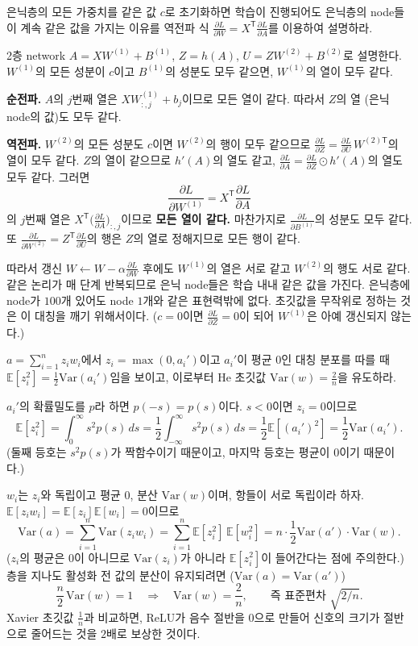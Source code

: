 \documentclass[11pt,a4paper]{article}
\newcommand{\T}{^{\mathsf T}}
\newcommand{\pd}[2]{\frac{\partial #1}{\partial #2}}
\begin{document}
\begin{problems}
\item 은닉층의 모든 가중치를 같은 값 $c$로 초기화하면 학습이 진행되어도 은닉층의 node들이
계속 같은 값을 가지는 이유를 역전파 식 $\pd{L}{W}=X\T\pd{L}{A}$를 이용하여 설명하라.

\begin{sol}
2층 network $A=XW^{(1)}+B^{(1)}$, $Z=h(A)$, $U=ZW^{(2)}+B^{(2)}$로 설명한다.
$W^{(1)}$의 모든 성분이 $c$이고 $B^{(1)}$의 성분도 모두 같으면, $W^{(1)}$의 열이 모두 같다.

\textbf{순전파.} $A$의 $j$번째 열은 $XW^{(1)}_{:,j}+b_j$이므로 모든 열이 같다. 따라서 $Z$의 열 (은닉 node의 값)도 모두 같다.

\textbf{역전파.} $W^{(2)}$의 모든 성분도 $c$이면 $W^{(2)}$의 행이 모두 같으므로 $\pd{L}{Z}=\pd{L}{U}\,W^{(2)\mathsf T}$의 열이 모두 같다.
$Z$의 열이 같으므로 $h'(A)$의 열도 같고, $\pd{L}{A}=\pd{L}{Z}\odot h'(A)$의 열도 모두 같다.
그러면
\[
\pd{L}{W^{(1)}}=X\T\pd{L}{A}
\]
의 $j$번째 열은 $X\T\bigl(\pd{L}{A}\bigr)_{:,j}$이므로 \textbf{모든 열이 같다.} 마찬가지로 $\pd{L}{B^{(1)}}$의 성분도 모두 같다.
또 $\pd{L}{W^{(2)}}=Z\T\pd{L}{U}$의 행은 $Z$의 열로 정해지므로 모든 행이 같다.

따라서 갱신 $W\leftarrow W-\alpha\pd{L}{W}$ 후에도 $W^{(1)}$의 열은 서로 같고 $W^{(2)}$의 행도 서로 같다.
같은 논리가 매 단계 반복되므로 은닉 node들은 학습 내내 같은 값을 가진다.
은닉층에 node가 $100$개 있어도 node $1$개와 같은 표현력밖에 없다.
초깃값을 무작위로 정하는 것은 이 대칭을 깨기 위해서이다.
($c=0$이면 $\pd{L}{Z}=0$이 되어 $W^{(1)}$은 아예 갱신되지 않는다.)
\end{sol}

\item $a=\sum_{i=1}^{n}z_iw_i$에서 $z_i=\max(0,a_i')$이고 $a_i'$이 평균 $0$인 대칭 분포를 따를 때
$\mathbb E[z_i^2]=\frac12\mathrm{Var}(a_i')$임을 보이고, 이로부터 He 초깃값 $\mathrm{Var}(w)=\frac2n$을 유도하라.

\begin{sol}
$a_i'$의 확률밀도를 $p$라 하면 $p(-s)=p(s)$이다. $s<0$이면 $z_i=0$이므로
\[
\mathbb E[z_i^2]=\int_0^{\infty}s^2p(s)\,ds
=\frac12\int_{-\infty}^{\infty}s^2p(s)\,ds
=\frac12\mathbb E[(a_i')^2]=\frac12\mathrm{Var}(a_i') .
\]
(둘째 등호는 $s^2p(s)$가 짝함수이기 때문이고, 마지막 등호는 평균이 $0$이기 때문이다.)

$w_i$는 $z_i$와 독립이고 평균 $0$, 분산 $\mathrm{Var}(w)$이며, 항들이 서로 독립이라 하자.
$\mathbb E[z_iw_i]=\mathbb E[z_i]\mathbb E[w_i]=0$이므로
\[
\mathrm{Var}(a)=\sum_{i=1}^{n}\mathrm{Var}(z_iw_i)=\sum_{i=1}^{n}\mathbb E[z_i^2]\,\mathbb E[w_i^2]
=n\cdot\frac12\mathrm{Var}(a')\cdot\mathrm{Var}(w) .
\]
($z_i$의 평균은 $0$이 아니므로 $\mathrm{Var}(z_i)$가 아니라 $\mathbb E[z_i^2]$이 들어간다는 점에 주의한다.)
층을 지나도 활성화 전 값의 분산이 유지되려면 ($\mathrm{Var}(a)=\mathrm{Var}(a')$)
\[
\frac n2\,\mathrm{Var}(w)=1\quad\Longrightarrow\quad\boxed{\mathrm{Var}(w)=\frac2n},\qquad\text{즉 표준편차 }\sqrt{2/n}.
\]
Xavier 초깃값 $\frac1n$과 비교하면, ReLU가 음수 절반을 $0$으로 만들어 신호의 크기가 절반으로 줄어드는 것을 $2$배로 보상한 것이다.
\end{sol}


\end{problems}
\end{document}

